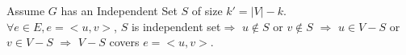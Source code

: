 \documentclass{article}%
\begin{document}
\begin{enumerate}
\begin{enumerate}
	Assume $G$ has an Independent Set $S$ of size $k'=|V|-k$.
	\\$\forall e\in E, e=<u,v>$, $S$ is independent set$\Rightarrow$ $u\notin S$ or $v\notin S$ $\Rightarrow$ $u\in V-S$ or $v\in V-S$ $\Rightarrow$ $V-S$ covers $e=<u,v>$.\\
	
	
\end{enumerate}
\end{enumerate}
\end{document}
